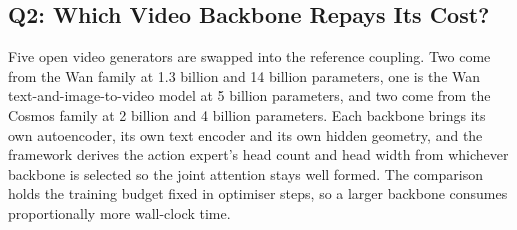 \begin{table}[t]
\centering
\small
\caption{Q1, coupling architecture. Success rate on the clean and randomized
RoboTwin 2.0 suites after training on clean demonstrations only, together with
the cost of each coupling. Rows marked \tgt{} carry pre-registered target values
for that configuration and the unmarked row is measured. The frozen
vision-language expert of the tri system contributes 2.0B additional
non-trainable parameters.}
\label{tab:q1}
\end{table}

\subsection{Q2: Which Video Backbone Repays Its Cost?}
\label{sec:q2}

Five open video generators are swapped into the reference coupling. Two come from
the Wan family at 1.3 billion and 14 billion parameters, one is the Wan
text-and-image-to-video model at 5 billion parameters, and two come from the
Cosmos family at 2 billion and 4 billion parameters. Each backbone brings its own
autoencoder, its own text encoder and its own hidden geometry, and the framework
derives the action expert's head count and head width from whichever backbone is
selected so the joint attention stays well formed. The comparison holds the
training budget fixed in optimiser steps, so a larger backbone consumes
proportionally more wall-clock time.

